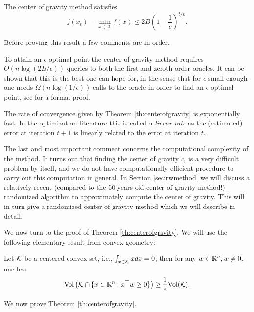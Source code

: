 \begin{theorem}
\label{th:centerofgravity}
The center of gravity method satisfies
$$f(x_t) - \min_{x \in \mathcal{X}} f(x) \leq 2 B \left(1 - \frac1{e} \right)^{t/n} .$$
\end{theorem}
Before proving this result a few comments are in order. 

To attain an $\epsilon$-optimal point the center of gravity method requires $O( n \log (2 B / \epsilon))$ queries to both the first and zeroth order oracles. It can be shown that this is the best one can hope for, in the sense that for $\epsilon$ small enough one needs $\Omega(n \log(1/ \epsilon))$ calls to the oracle in order to find an $\epsilon$-optimal point, see \cite{NY83} for a formal proof.

The rate of convergence given by Theorem \ref{th:centerofgravity} is exponentially fast. In the optimization literature this is called a {\em linear rate} as the (estimated) error at iteration $t+1$ is linearly related to the error at iteration $t$.

The last and most important comment concerns the computational complexity of the method. It turns out that finding the center of gravity $c_t$ is a very difficult problem by itself, and we do not have computationally efficient procedure to carry out this computation in general. In Section \ref{sec:rwmethod} we will discuss a relatively recent (compared to the 50 years old center of gravity method!) randomized algorithm to approximately compute the center of gravity. This will in turn give a randomized center of gravity method which we will describe in detail.

We now turn to the proof of Theorem \ref{th:centerofgravity}. We will use the following elementary result from convex geometry:

\begin{lemma} \label{lem:Gru60}
Let $\mathcal{K}$ be a centered convex set, i.e., $\int_{x \in \mathcal{K}} x dx = 0$, then for any $w \in \mathbb{R}^n, w \neq 0$, one has
$$\mathrm{Vol} \left( \mathcal{K} \cap \{x \in \mathbb{R}^n : x^{\top} w \geq 0\} \right) \geq \frac{1}{e} \mathrm{Vol} (\mathcal{K}) .$$
\end{lemma}
We now prove Theorem \ref{th:centerofgravity}.


